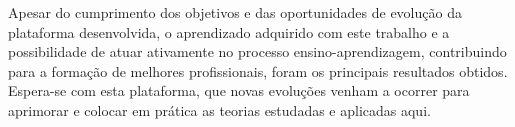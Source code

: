 Apesar do cumprimento dos objetivos e das oportunidades de evolução da plataforma desenvolvida, o aprendizado adquirido com este trabalho e a possibilidade de atuar ativamente no processo ensino-aprendizagem, contribuindo para a formação de melhores profissionais, foram os principais resultados obtidos. Espera-se com esta plataforma, que novas evoluções venham a ocorrer para aprimorar e colocar em prática as teorias estudadas e aplicadas aqui.

